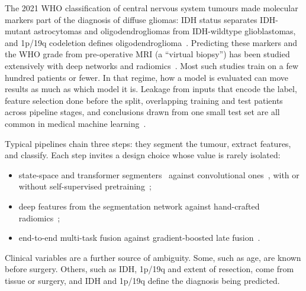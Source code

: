 \documentclass[11pt]{article}
\begin{document}
The 2021 WHO classification of central nervous system tumours made molecular markers part of the diagnosis of
diffuse gliomas: IDH status separates IDH-mutant astrocytomas and oligodendrogliomas from IDH-wildtype
glioblastomas, and 1p/19q codeletion defines oligodendroglioma~\cite{louis2021who}. Predicting these markers and the
WHO grade from pre-operative MRI (a ``virtual biopsy'') has been studied extensively with deep networks and
radiomics~\cite{chang2018ajnr,chang2018ccr,choi2021idh,patel2017mismatch}. Most such studies train on a few hundred
patients or fewer. In that regime, how a model is evaluated can move results as much as which model it is.
Leakage from inputs that encode the label, feature selection done before the split, overlapping training and test
patients across pipeline stages, and conclusions drawn from one small test set are all common in medical machine
learning~\cite{kapoor2023leakage,varoquaux2022failures,varoquaux2018cv}.

Typical pipelines chain three steps: they segment the tumour, extract features, and classify. Each step invites a
design choice whose value is rarely isolated:
\begin{itemize}
  \item state-space and transformer segmenters~\cite{xing2024segmamba,hatamizadeh2022swinunetr} against convolutional
        ones~\cite{myronenko2019segresnet,isensee2021nnunet}, with or without self-supervised
        pretraining~\cite{tang2022ssl};
  \item deep features from the segmentation network against hand-crafted radiomics~\cite{vangriethuysen2017pyradiomics};
  \item end-to-end multi-task fusion against gradient-boosted late fusion~\cite{chen2016xgboost}.
\end{itemize}
Clinical variables are a further source of ambiguity. Some, such as age, are known before surgery. Others, such as
IDH, 1p/19q and extent of resection, come from tissue or surgery, and IDH and 1p/19q define the diagnosis being
predicted.
\end{document}
